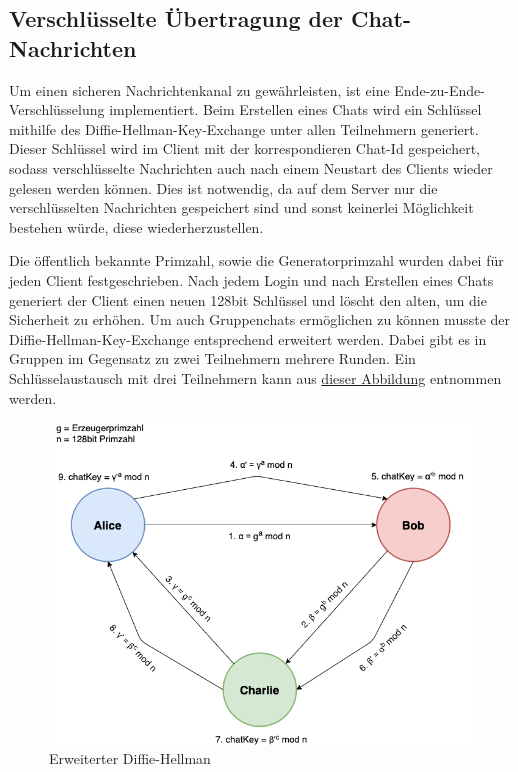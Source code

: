 \author{Troy Keßler, Michael Angermeier}
\subsection{Verschlüsselte Übertragung der Chat-Nachrichten}\label{encryption}
Um einen sicheren Nachrichtenkanal zu gewährleisten, ist eine Ende-zu-Ende-Verschlüsselung implementiert. 
Beim Erstellen eines Chats wird ein Schlüssel mithilfe des Diffie-Hellman-Key-Exchange unter allen Teilnehmern generiert.
Dieser Schlüssel wird im Client mit der korrespondieren Chat-Id gespeichert, sodass verschlüsselte Nachrichten
auch nach einem Neustart des Clients wieder gelesen werden können. Dies ist notwendig, da auf dem Server nur die verschlüsselten
Nachrichten gespeichert sind und sonst keinerlei Möglichkeit bestehen würde, diese wiederherzustellen. 

Die öffentlich bekannte Primzahl, sowie die Generatorprimzahl wurden dabei für jeden Client festgeschrieben.
Nach jedem Login und nach Erstellen eines Chats generiert der Client einen neuen 128bit Schlüssel und löscht den alten, um die Sicherheit zu erhöhen.
Um auch Gruppenchats ermöglichen zu können musste der Diffie-Hellman-Key-Exchange entsprechend erweitert werden.
Dabei gibt es in Gruppen im Gegensatz zu zwei Teilnehmern mehrere Runden.
Ein Schlüsselaustausch mit drei Teilnehmern kann aus \hyperref[DHKE]{dieser Abbildung} entnommen werden.

\begin{figure}[h]
  \centering
  \includegraphics[width=\textwidth]{dh.png}
  
  \caption{Erweiterter Diffie-Hellman}
  \label{DHKE}
\end{figure}

